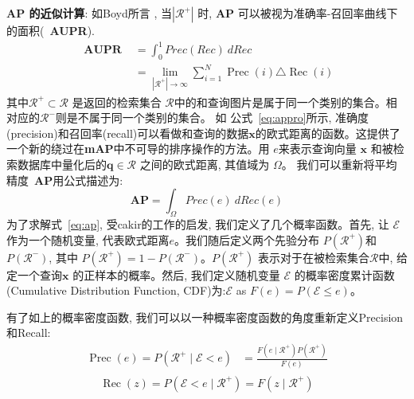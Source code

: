 \textbf{AP 的近似计算}: 如Boyd所言 \cite{boyd2013area}, 当$|\mathcal{R}^{+}|$ 时, \textbf{AP} 可以被视为准确率-召回率曲线下的面积(~\textbf{AUPR}).
\begin{equation}
    \label{eq:appro}
    \begin{aligned}
    \textbf { AUPR } &=\int_{0}^{1} Prec(Rec) \ d Rec \\
    &=\lim _{\left|\mathcal{R}^{+}\right| \rightarrow \infty} \sum_{i=1}^{N} \operatorname{Prec}(i) \triangle \operatorname{Rec}(i)
    \end{aligned}
\end{equation}
其中$\mathcal{R}^{+} \subset \mathcal{R}$ 是返回的检索集合 $\mathcal{R}$中的和查询图片是属于同一个类别的集合。相对应的$\mathcal{R}^{-}$则是不属于同一个类别的集合。 如 公式~\ref{eq:appro}所示, 准确度(precision)和召回率(recall)可以看做和查询的数据$\mathbf{x}$的欧式距离的函数。这提供了一个新的绕过在\textbf{mAP}中不可导的排序操作的方法。用 $e$来表示查询向量 $\mathbf{x}$ 和被检索数据库中量化后的$\mathbf{q} \in {\mathcal{R}}$ 之间的欧式距离, 其值域为 $\Omega$。 我们可以重新将平均精度~\textbf{AP}用公式描述为:
\begin{equation}
    \label{eq:ap}
     \textbf{AP} = \int_{\Omega}Prec(e) \ dRec(e)
\end{equation}
为了求解式~\ref{eq:ap}, 受cakir的工作\cite{cakir2019deep}的启发, 我们定义了几个概率函数。首先, 让 $\mathcal{E}$ 作为一个随机变量, 代表欧式距离$e$。我们随后定义两个先验分布 $P(\mathcal{R}^{+})$和$P(\mathcal{R}^{-})$, 其中 $P(\mathcal{R}^{+}) = 1 - P(\mathcal{R}^{-})$。$P(\mathcal{R}^{+})$ 表示对于在被检索集合$\mathcal{R}$中, 给定一个查询$\mathbf{x}$ 的正样本的概率。然后, 我们定义随机变量 $\mathcal{E}$ 的概率密度累计函数(Cumulative Distribution Function, CDF)为:$\mathcal{E}$ as $F(e) = P(\mathcal{E} \le e)$。 \par
有了如上的概率密度函数, 我们可以以一种概率密度函数的角度重新定义Precision 和Recall:
\begin{equation}
    \label{eq:bayesian}
    \begin{aligned}
    \operatorname{Prec}(e)=P\left(\mathcal{R}^{+} \mid \mathcal{E}<e\right) 
    &=\frac{F\left(e \mid \mathcal{R}^{+}\right) P\left(\mathcal{R}^{+}\right)}{F(e)} \\
    \end{aligned}
    \end{equation}
\begin{equation}
\operatorname{Rec}(z)=P\left(\mathcal{E}<e \mid \mathcal{R}^{+}\right)=F\left(z \mid \mathcal{R}^{+}\right)
\end{equation}
